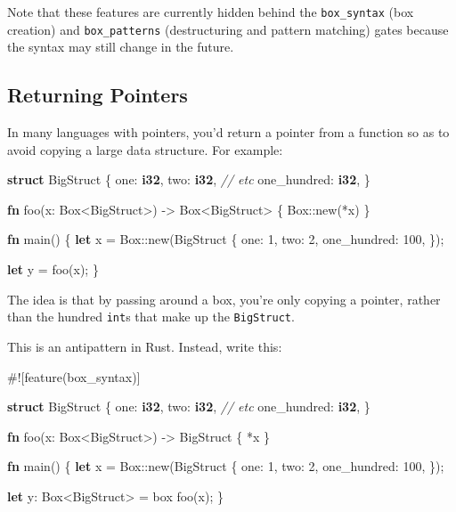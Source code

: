 \documentclass[a4paper,]{book}
\newenvironment{Shaded}{\begin{snugshade}}{\end{snugshade}}
\newcommand{\KeywordTok}[1]{\textcolor[rgb]{0.13,0.29,0.53}{\textbf{{#1}}}}
\newcommand{\DecValTok}[1]{\textcolor[rgb]{0.00,0.00,0.81}{{#1}}}
\newcommand{\CommentTok}[1]{\textcolor[rgb]{0.56,0.35,0.01}{\textit{{#1}}}}
\newcommand{\NormalTok}[1]{{#1}}
\begin{document}
Note that these features are currently hidden behind the
\texttt{box\_syntax} (box creation) and \texttt{box\_patterns}
(destructuring and pattern matching) gates because the syntax may still
change in the future.

\subsection{Returning Pointers}\label{returning-pointers}

In many languages with pointers, you'd return a pointer from a function
so as to avoid copying a large data structure. For example:

\begin{Shaded}
\begin{Highlighting}[]
\KeywordTok{struct} \NormalTok{BigStruct \{}
    \NormalTok{one: }\KeywordTok{i32}\NormalTok{,}
    \NormalTok{two: }\KeywordTok{i32}\NormalTok{,}
    \CommentTok{// etc}
    \NormalTok{one_hundred: }\KeywordTok{i32}\NormalTok{,}
\NormalTok{\}}

\KeywordTok{fn} \NormalTok{foo(x: Box<BigStruct>) -> Box<BigStruct> \{}
    \NormalTok{Box::new(*x)}
\NormalTok{\}}

\KeywordTok{fn} \NormalTok{main() \{}
    \KeywordTok{let} \NormalTok{x = Box::new(BigStruct \{}
        \NormalTok{one: }\DecValTok{1}\NormalTok{,}
        \NormalTok{two: }\DecValTok{2}\NormalTok{,}
        \NormalTok{one_hundred: }\DecValTok{100}\NormalTok{,}
    \NormalTok{\});}

    \KeywordTok{let} \NormalTok{y = foo(x);}
\NormalTok{\}}
\end{Highlighting}
\end{Shaded}

The idea is that by passing around a box, you're only copying a pointer,
rather than the hundred \texttt{int}s that make up the
\texttt{BigStruct}.

This is an antipattern in Rust. Instead, write this:

\begin{Shaded}
\begin{Highlighting}[]
\NormalTok{#![feature(box_syntax)]}

\KeywordTok{struct} \NormalTok{BigStruct \{}
    \NormalTok{one: }\KeywordTok{i32}\NormalTok{,}
    \NormalTok{two: }\KeywordTok{i32}\NormalTok{,}
    \CommentTok{// etc}
    \NormalTok{one_hundred: }\KeywordTok{i32}\NormalTok{,}
\NormalTok{\}}

\KeywordTok{fn} \NormalTok{foo(x: Box<BigStruct>) -> BigStruct \{}
    \NormalTok{*x}
\NormalTok{\}}

\KeywordTok{fn} \NormalTok{main() \{}
    \KeywordTok{let} \NormalTok{x = Box::new(BigStruct \{}
        \NormalTok{one: }\DecValTok{1}\NormalTok{,}
        \NormalTok{two: }\DecValTok{2}\NormalTok{,}
        \NormalTok{one_hundred: }\DecValTok{100}\NormalTok{,}
    \NormalTok{\});}

    \KeywordTok{let} \NormalTok{y: Box<BigStruct> = box foo(x);}
\NormalTok{\}}
\end{Highlighting}
\end{Shaded}
\end{document}
